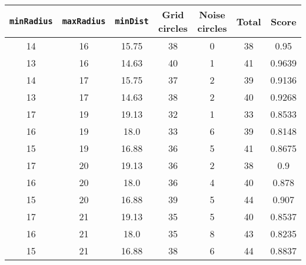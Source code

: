 \documentclass[letterpaper, 12pt]{article}
\begin{document}
\begin{longtable}{|c|c|c|c|c|c|c|}
\hline
\textbf{\texttt{minRadius}} & \textbf{\texttt{maxRadius}} & \textbf{\texttt{minDist}} & \textbf{Grid circles} & \textbf{Noise circles} & \textbf{Total} & \textbf{Score} \\
\hline
14 & 16 & 15.75 & 38 & 0 & 38 & 0.95 \\
\hline
13 & 16 & 14.63 & 40 & 1 & 41 & 0.9639 \\
\hline
14 & 17 & 15.75 & 37 & 2 & 39 & 0.9136 \\
\hline
13 & 17 & 14.63 & 38 & 2 & 40 & 0.9268 \\
\hline
17 & 19 & 19.13 & 32 & 1 & 33 & 0.8533 \\
\hline
16 & 19 & 18.0 & 33 & 6 & 39 & 0.8148 \\
\hline
15 & 19 & 16.88 & 36 & 5 & 41 & 0.8675 \\
\hline
17 & 20 & 19.13 & 36 & 2 & 38 & 0.9 \\
\hline
16 & 20 & 18.0 & 36 & 4 & 40 & 0.878 \\
\hline
15 & 20 & 16.88 & 39 & 5 & 44 & 0.907 \\
\hline
17 & 21 & 19.13 & 35 & 5 & 40 & 0.8537 \\
\hline
16 & 21 & 18.0 & 35 & 8 & 43 & 0.8235 \\
\hline
15 & 21 & 16.88 & 38 & 6 & 44 & 0.8837 \\
\hline
\end{longtable}
\end{document}
